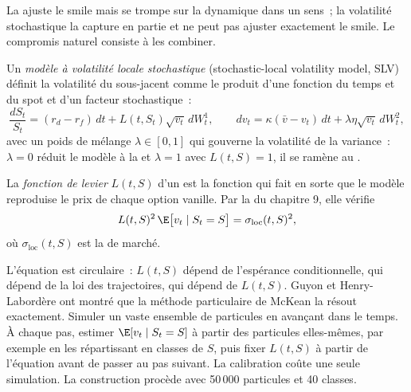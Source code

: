 La  ajuste le smile mais se trompe sur la dynamique dans un sens~; la volatilité stochastique la capture en partie et ne peut
pas ajuster exactement le smile. Le compromis naturel consiste à les combiner.

\begin{definition}\label{def:dv:fx-derivatives:slv}
Un \emph{modèle à volatilité locale stochastique} (stochastic-local volatility model, SLV) définit la volatilité du sous-jacent comme le
produit d'une fonction du temps et du spot et d'un facteur stochastique~:
\[
\frac{dS_t}{S_t}=(r_d-r_f)\,dt+L(t,S_t)\sqrt{v_t}\,dW^1_t,\qquad dv_t=\kappa(\bar v-v_t)\,dt+\lambda\eta\sqrt{v_t}\,dW^2_t,
\]
avec un poids de mélange $\lambda\in[0,1]$ qui gouverne la volatilité de la variance~: $\lambda=0$ réduit le modèle à la  et $\lambda=1$
avec $L(t,S)=1$, il se ramène au .
\end{definition}

\begin{definition}\label{def:dv:fx-derivatives:leverage}
La \emph{fonction de levier} $L(t,S)$ d'un  est la fonction qui fait en sorte que le modèle
reproduise le prix de chaque option vanille. Par la  du chapitre 9, elle vérifie
\[
L(t,S)^2\,\E\bigl[v_t\mid S_t=S\bigr]=\sigma_{\mathrm{loc}}(t,S)^2,
\]
où $\sigma_{\mathrm{loc}}(t,S)$ est la  de marché.
\end{definition}

L'équation est circulaire~: $L(t,S)$ dépend de l'espérance conditionnelle, qui dépend de la loi des trajectoires, qui dépend de $L(t,S)$.
Guyon et Henry-Labordère ont montré que la méthode particulaire de McKean la résout exactement. Simuler un vaste ensemble de particules en avançant dans le temps.
À chaque pas, estimer $\E[v_t\mid S_t=S]$ à partir des particules elles-mêmes, par exemple en les répartissant en classes de $S$, puis fixer
$L(t,S)$ à partir de l'équation avant de passer au pas suivant. La calibration coûte une seule simulation. La construction procède avec 50\,000 particules
et 40 classes.

